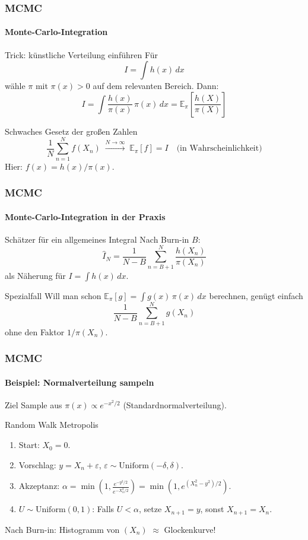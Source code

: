\documentclass{beamer}
\newcommand{\E}{\mathbb{E}}
\begin{document}

\begin{frame}
    \frametitle{MCMC}
\framesubtitle{Monte-Carlo-Integration}
    \begin{block}{Trick: künstliche Verteilung einführen}
Für
\[
I = \int h(x)\, dx
\]
wähle $\pi$ mit $\pi(x) > 0$ auf dem relevanten Bereich. Dann:
\[
I = \int \frac{h(x)}{\pi(x)}\, \pi(x)\, dx = \E_\pi\!\left[\frac{h(X)}{\pi(X)}\right]
\]
\end{block}
\begin{block}{Schwaches Gesetz der großen Zahlen}
\[
\frac{1}{N} \sum_{n=1}^{N} f(X_n) \;\xrightarrow{N \to \infty}\; \E_\pi[f] = I \quad \text{(in Wahrscheinlichkeit)}
\]
Hier: $f(x) = h(x)/\pi(x)$.
\end{block}
 \end{frame}


\begin{frame}
    \frametitle{MCMC}
\framesubtitle{Monte-Carlo-Integration in der Praxis}
    \begin{block}{Schätzer für ein allgemeines Integral}
Nach Burn-in $B$:
\[
\widehat I_N = \frac{1}{N-B} \sum_{n=B+1}^{N} \frac{h(X_n)}{\pi(X_n)}
\]
als Näherung für $I = \int h(x)\, dx$.
\end{block}
\begin{block}{Spezialfall}
Will man schon $\E_\pi[g] = \int g(x)\,\pi(x)\,dx$ berechnen, genügt einfach
\[
\frac{1}{N-B} \sum_{n=B+1}^{N} g(X_n)
\]
ohne den Faktor $1/\pi(X_n)$.
\end{block}
 \end{frame}



\begin{frame}
    \frametitle{MCMC}
\framesubtitle{Beispiel: Normalverteilung sampeln}
    \begin{block}{Ziel}
Sample aus $\pi(x) \propto e^{-x^2/2}$ (Standardnormalverteilung).
\end{block}
\begin{block}{Random Walk Metropolis}
\begin{enumerate}
\item Start: $X_0 = 0$.
\item Vorschlag: $y = X_n + \varepsilon$, \quad $\varepsilon \sim \text{Uniform}(-\delta, \delta)$.
\item Akzeptanz: $\alpha = \min\!\left(1, \frac{e^{-y^2/2}}{e^{-X_n^2/2}}\right) = \min\!\left(1, e^{(X_n^2 - y^2)/2}\right)$.
\item $U \sim \text{Uniform}(0,1)$: Falls $U < \alpha$, setze $X_{n+1} = y$, sonst $X_{n+1} = X_n$.
\end{enumerate}
\end{block}
Nach Burn-in: Histogramm von $(X_n)$ $\approx$ Glockenkurve!
 \end{frame}
\end{document}
